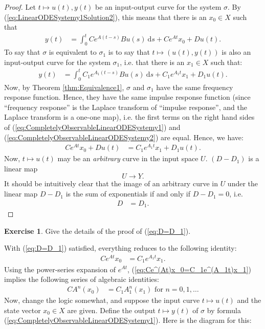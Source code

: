 \documentclass[12pt]{book}
\theoremstyle{plain}
\theoremstyle{definition}
\newtheorem{exercise}{Exercise}[section]
\newcommand{\dd}[1]{\mathrm{d}#1}
\begin{document}
\begin{proof}
    Let $t \mapsto u(t), y(t)$ be an input-output curve for the system $\sigma$.
    By (\ref{eq:LinearODESystemy1Solution2}), this means that there is an $x_0 \in X$ such that
    \begin{align} \label{eq:CompletelyObservableLinearODESystemy1}
        y(t) &= \int_0^t Ce^{A(t-s)}Bu(s)\ \dd{s} + Ce^{At}x_0 + Du(t).
    \end{align}
    To say that $\sigma$ is equivalent to $\sigma_1$ is to say that $t \mapsto (u(t), y(t))$ is also an input-output curve for the system $\sigma_1$, i.e. that there is an $x_1 \in X$ such that:
    \begin{align} \label{eq:CompletelyObservableLinearODESystemy2}
        y(t) &= \int_0^t C_1e^{A_1(t-s)}Bu(s)\ \dd{s} + C_1e^{A_1t}x_1 + D_1u(t).
    \end{align}
    Now, by Theorem \ref{thm:Equivalence1}, $\sigma$ and $\sigma_1$ have the same frequency response function.
    Hence, they have the same impulse response function (since ``frequency response'' is the Laplace transform of ``impulse response'', and the Laplace transform is a one-one map), i.e. the first terms on the right hand sides of (\ref{eq:CompletelyObservableLinearODESystemy1}) and (\ref{eq:CompletelyObservableLinearODESystemy2}) are equal.
    Hence, we have:
    \begin{align}
        Ce^{At}x_0 + Du(t) &= C_1e^{A_1t}x_1 + D_1u(t).
    \end{align}
    Now, $t \mapsto u(t)$ may be an \emph{arbitrary} curve in the input space $U$. $(D-D_1)$ is a linear map
    $$U \to Y.$$
    It should be intuitively clear that the image of an arbitrary curve in $U$ under the linear map $D-D_1$ is the sum of exponentials if and only if $D-D_1=0$, i.e.
    \begin{align} \label{eq:D=D_1}
        D &= D_1.
    \end{align}
\end{proof}

\begin{exercise}
    Give the details of the proof of (\ref{eq:D=D_1}).
\end{exercise}

With (\ref{eq:D=D_1}) satisfied, everything reduces to the following identity:
\begin{align} \label{eq:Ce^(At)x_0=C_1e^(A_1t)x_1}
    Ce^{At}x_0 &= C_1e^{A_1t}x_1.
\end{align}
Using the power-series expansion of $e^{At}$, (\ref{eq:Ce^(At)x_0=C_1e^(A_1t)x_1}) implies the following series of algebraic identities:
\begin{align} \label{eq:AlgebraicIdentities1}
    CA^n(x_0) &= C_1A_1^n(x_1) \text{ for } n = 0, 1, \dots
\end{align}
Now, change the logic somewhat, and suppose the input curve $t \mapsto u(t)$ and the state vector $x_0 \in X$ are given.
Define the output $t \mapsto y(t)$ of $\sigma$ by formula (\ref{eq:CompletelyObservableLinearODESystemy1}).
Here is the diagram for this:
\end{document}
